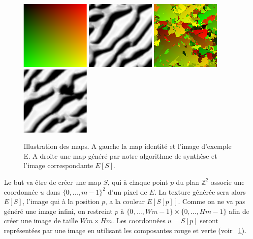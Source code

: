 \documentclass[12pt]{article}
\newcommand{\Z}{\mathbb{Z}}
\begin{document}
\begin{figure}[t]
	\centering
	\includegraphics[scale=2.5]{S0.png}
	\includegraphics[scale=2.5]{E0.png}
	\qquad \qquad
	\includegraphics[scale=2.5]{S1.png}
	\includegraphics[scale=2.5]{E1.png}
	\captionsetup{justification=centering}
	\caption{Illustration des maps. A gauche la map identité et l'image d'exemple E. A droite une map généré par notre algorithme de synthèse et l'image correspondante $E[S]$.}
	\label{map_illu}
\end{figure}

Le but va être de créer une map $S$, qui à chaque point $p$ du plan $\Z^2$ associe une coordonnée $u$ dans $\{ 0, \dots, m-1 \}^2$ d'un pixel de $E$. La texture générée sera alors $E[S]$, l'image qui à la position $p$, a la couleur $E[S[p]]$. Comme on ne va pas généré une image infini, on restreint $p$ à $\{ 0, \dots, Wm-1 \} \times \{ 0, \dots, Hm-1 \}$ afin de créer une image de taille $Wm \times Hm$. Les coordonnées $u = S[p]$ seront représentées par une image en utilisant les composantes rouge et verte (voir \figurename~\ref{map_illu}).
\end{document}
